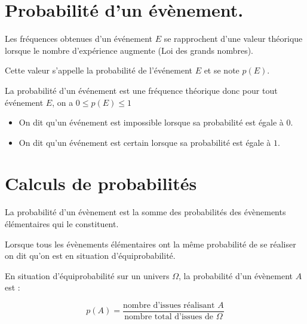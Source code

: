 
\begin{pageCours} %


\section{Probabilité d'un évènement.}

\begin{Def}
Les fréquences obtenues d'un événement $E$ se rapprochent d'une valeur théorique lorsque le nombre d'expérience augmente (Loi des grands nombres).

Cette valeur s'appelle la probabilité de l'événement $E$ et se note $p(E)$.
\end{Def}

\begin{Pp}
La probabilité d'un événement est une fréquence théorique donc pour tout événement $E$, on a $0\leq p(E)\leq1$
\end{Pp}

\begin{Def}
\begin{itemize}
\item On dit qu'un événement est impossible lorsque sa probabilité est égale à $0$.
\item On dit qu'un événement est certain lorsque sa probabilité est égale à $1$.
\end{itemize}
\end{Def}

\section{Calculs de probabilités}

\begin{Pp}
La probabilité d'un évènement est la somme des probabilités des évènements élémentaires qui le constituent.
\end{Pp}

\begin{Def}
Lorsque tous les évènements élémentaires ont la même probabilité de se réaliser on dit qu'on est en situation d'équiprobabilité.
\end{Def}

\begin{Pp}
En situation d'équiprobabilité sur un univers $\Omega$, la probabilité d'un évènement $A$ est :

\[p(A)=\frac{\text{nombre d'issues réalisant }A}{\text{nombre total d'issues de }\Omega}\]
\end{Pp}

\end{pageCours} %

